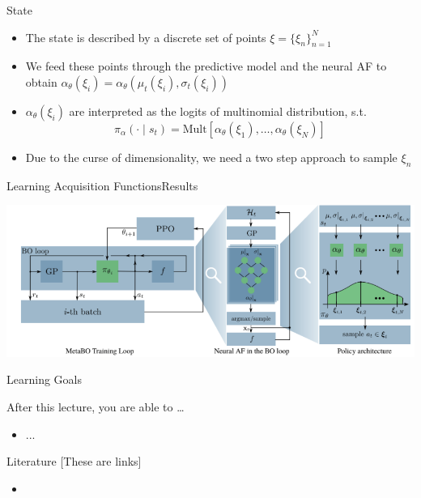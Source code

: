\begin{frame}[c]{State }

\begin{itemize}
	\item The state is described by a discrete set of points $\xi = \{\xi_n\}^N_{n=1}$
	\pause
	\item We feed these points through the predictive model and the neural AF to obtain $\alpha_\theta(\xi_i) = \alpha_\theta(\mu_t(\xi_i), \sigma_t(\xi_i)) $
	\pause
	\item $\alpha_\theta(\xi_i)$ are interpreted as the logits of multinomial distribution, s.t.
	$$\pi_\alpha(\cdot \mid s_t) = \text{Mult}\left[\alpha_\theta(\xi_1), \ldots, \alpha_\theta(\xi_N) \right] $$
	\pause
	\item Due to the curse of dimensionality, we need a two step approach to sample $\xi_n$
\end{itemize}

\end{frame}
\begin{frame}[c,fragile]{Learning Acquisition Functions\newline Results }

\centering
\includegraphics[width=1.0\textwidth]{images/l2acq.png}


\end{frame}

\begin{frame}[c]{Learning Goals}

After this lecture, you are able to \ldots

\begin{itemize}
	\item ...
\end{itemize}
\end{frame}

\begin{frame}[c]{Literature [These are links]}

\begin{itemize}
	\item \lit{\href{}{}}	
\end{itemize}

\end{frame}


